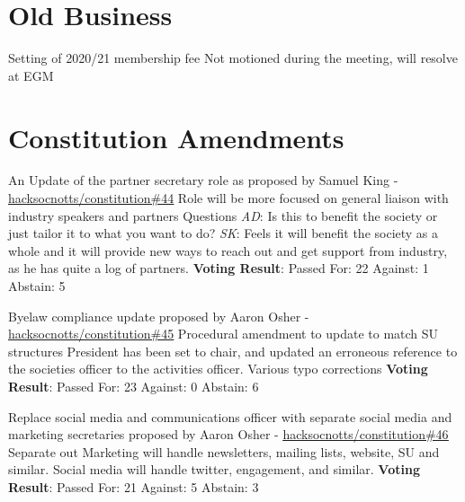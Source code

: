 \documentclass[11pt]{meetingmins}
\begin{document}
\section{Old Business}
\begin{items}
	\item
	Setting of 2020/21 membership fee
		\subitem
		Not motioned during the meeting, will resolve at EGM
\end{items}

\section{Constitution Amendments}
\begin{items}
	\item
	An Update of the partner secretary role as proposed by Samuel King - \underline{\href{https://github.com/HackSocNotts/constitution/pull/44}{hacksocnotts/constitution\#44}}
		\subitem
		Role will be more focused on general liaison with industry speakers and partners 
		\subitem
		Questions
			\subsubitem
			\textit{AD}: Is this to benefit the society or just tailor it to what you want to do?
			\subsubitem
			\textit{SK}: Feels it will benefit the society as a whole and it will provide new ways to reach out and get support from industry, as he has quite a log of partners.
		\subitem
		\textbf{Voting Result}: Passed
			\subsubitem
			For: 22
			\subsubitem
			Against: 1
			\subsubitem
			Abstain: 5
			
	\item
	Byelaw compliance update proposed by Aaron Osher - \underline{\href{https://github.com/HackSocNotts/constitution/pull/45}{hacksocnotts/constitution\#45}}
		\subitem
		Procedural amendment to update to match SU structures
		\subitem
		President has been set to chair, and updated an erroneous reference to the societies officer to the activities officer.
		\subitem
		Various typo corrections
		\subitem
		\textbf{Voting Result}: Passed
			\subsubitem
			For: 23
			\subsubitem
			Against: 0
			\subsubitem
			Abstain: 6
	
	\item
	Replace social media and communications officer with separate social media and marketing secretaries proposed by Aaron Osher - \underline{\href{https://github.com/HackSocNotts/constitution/pull/46}{hacksocnotts/constitution\#46}}
		\subitem
		Separate out Marketing will handle newsletters, mailing lists, website, SU and similar. Social media will handle twitter, engagement, and similar.
		\subitem
		\textbf{Voting Result}: Passed
			\subsubitem
			For: 21
			\subsubitem
			Against: 5
			\subsubitem
			Abstain: 3

\end{items}
\end{document}

